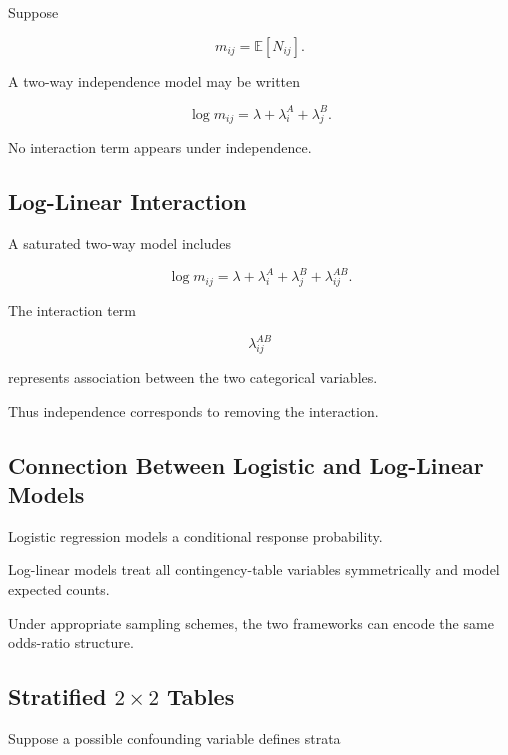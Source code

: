 Suppose

\[
m_{ij}
=
\mathbb{E}[N_{ij}].
\]

A two-way independence model may be written

\[
\boxed{
\log m_{ij}
=
\lambda
+
\lambda_i^A
+
\lambda_j^B.
}
\]

No interaction term appears under independence.

\subsection{Log-Linear Interaction}
\label{subsec:log-linear-interaction}

A saturated two-way model includes

\[
\boxed{
\log m_{ij}
=
\lambda
+
\lambda_i^A
+
\lambda_j^B
+
\lambda_{ij}^{AB}.
}
\]

The interaction term

\[
\lambda_{ij}^{AB}
\]

represents association between the two categorical variables.

Thus independence corresponds to removing the interaction.

\subsection{Connection Between Logistic and Log-Linear Models}
\label{subsec:logistic-loglinear-connection}

Logistic regression models a conditional response probability.

Log-linear models treat all contingency-table variables symmetrically and
model expected counts.

Under appropriate sampling schemes, the two frameworks can encode the
same odds-ratio structure.

\subsection{Stratified \(2\times2\) Tables}
\label{subsec:stratified-two-by-two}

Suppose a possible confounding variable defines strata

